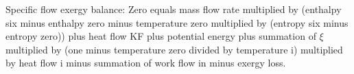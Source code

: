 Specific flow exergy balance:  
Zero equals mass flow rate multiplied by (enthalpy six minus enthalpy zero minus temperature zero multiplied by (entropy six minus entropy zero)) plus heat flow KF plus potential energy plus summation of \( \xi \) multiplied by (one minus temperature zero divided by temperature i) multiplied by heat flow i minus summation of work flow in minus exergy loss.